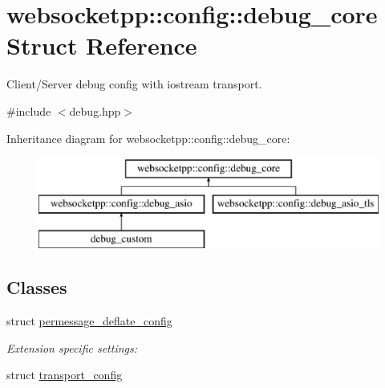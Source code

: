 \hypertarget{structwebsocketpp_1_1config_1_1debug__core}{}\section{websocketpp\+:\+:config\+:\+:debug\+\_\+core Struct Reference}
\label{structwebsocketpp_1_1config_1_1debug__core}


Client/\+Server debug config with iostream transport.  




{\ttfamily \#include $<$debug.\+hpp$>$}

Inheritance diagram for websocketpp\+:\+:config\+:\+:debug\+\_\+core\+:\begin{figure}[H]
\begin{center}
\leavevmode
\includegraphics[height=3.000000cm]{structwebsocketpp_1_1config_1_1debug__core}
\end{center}
\end{figure}
\subsection*{Classes}
\begin{DoxyCompactItemize}
\item 
struct \hyperlink{structwebsocketpp_1_1config_1_1debug__core_1_1permessage__deflate__config}{permessage\+\_\+deflate\+\_\+config}
\begin{DoxyCompactList}\small\item\em Extension specific settings\+: \end{DoxyCompactList}\item 
struct \hyperlink{structwebsocketpp_1_1config_1_1debug__core_1_1transport__config}{transport\+\_\+config}
\end{DoxyCompactItemize}
